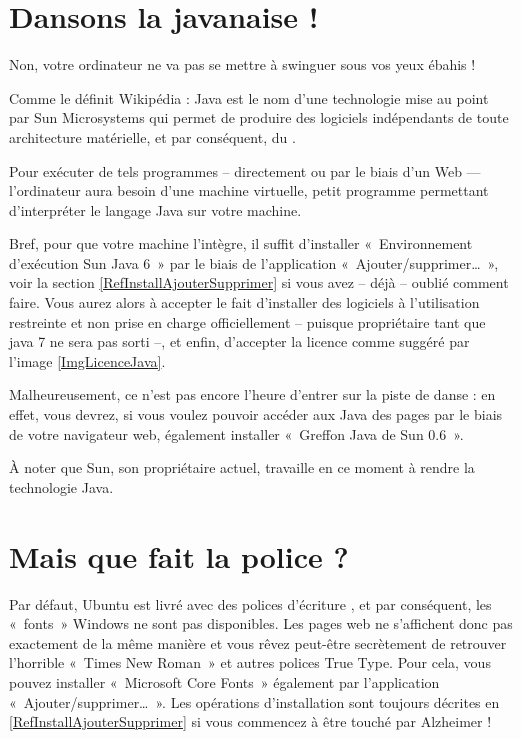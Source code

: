 \section{Dansons la javanaise !}
\label{RefInstallJava}
Non, votre ordinateur ne va pas se mettre à swinguer sous vos yeux ébahis !\par
\begin{citationlongue}{Comme le définit Wikipédia :}
Java est le nom d'une technologie mise au point par Sun Microsystems qui permet de produire des logiciels indépendants de toute architecture matérielle, et par conséquent, du .
\end{citationlongue}
Pour exécuter de tels programmes -- directement ou par le biais d'un  Web --- l'ordinateur aura besoin d'une machine virtuelle, petit programme permettant d'interpréter le langage Java sur votre machine.\par
Bref, pour que votre machine l'intègre, il suffit d'installer «~Environnement d'exécution Sun Java 6~» par le biais de l'application «~Ajouter/supprimer\dots{}~», voir la section \ref{RefInstallAjouterSupprimer} si vous avez -- déjà -- oublié comment faire. Vous aurez alors à accepter le fait d'installer des logiciels à l'utilisation restreinte et non prise en charge officiellement -- puisque propriétaire tant que java 7 ne sera pas sorti --, et enfin, d'accepter la licence comme suggéré par l'image \ref{ImgLicenceJava}.\par
{}
Malheureusement, ce n'est pas encore l'heure d'entrer sur la piste de danse : en effet, vous devrez, si vous voulez pouvoir accéder aux  Java des pages  par le biais de votre navigateur web, également installer «~Greffon Java de Sun 0.6~».
\begin{nota}
À noter que Sun, son propriétaire actuel, travaille en ce moment à rendre  la technologie Java.
\end{nota}
\section{Mais que fait la police ?}
Par défaut, Ubuntu est livré avec des polices d'écriture , et par conséquent, les «~fonts~» Windows ne sont pas disponibles. Les pages web ne s'affichent donc pas exactement de la même manière et vous rêvez peut-être secrètement de retrouver l'horrible «~Times New Roman~» et autres polices True Type. Pour cela, vous pouvez installer «~Microsoft Core Fonts~» également par l'application «~Ajouter/supprimer\dots{}~». Les opérations d'installation sont toujours décrites en \ref{RefInstallAjouterSupprimer} si vous commencez à être touché par Alzheimer !
